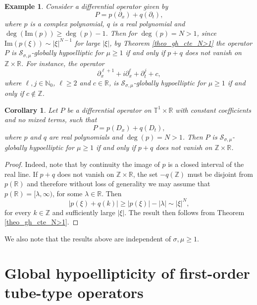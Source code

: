 \documentclass[11pt,reqno]{amsart}
\numberwithin{equation}{section}
\newtheorem{corollary}[theorem]{Corollary}
\newtheorem{example}[theorem]{Example}
\theoremstyle{definition}
\theoremstyle{definition}
\newcommand{\T}{\mathbb{T}}
\newcommand{\R}{\mathbb{R}}
\newcommand{\Z}{\mathbb{Z}}
\newcommand{\N}{\mathbb{N}}
\newcommand{\Imag}{\mathrm{Im}}
\begin{document}
\begin{example}
    Consider a differential operator  given by
    \begin{equation*}
        P=p(\partial_x)+q(\partial_t),
    \end{equation*}
    where $p$ is a complex polynomial, $q$ is a real polynomial and $\deg(\Imag(p))\geq \deg(p)-1$. Then for $\deg(p)=N>1$, since $\Imag(p(\xi))\sim |\xi|^{N-1}$ for large $|\xi|$, by Theorem \ref{theo_gh_cte_N>1} the operator $P$ is $\mathcal{S}_{\sigma,\mu}$-globally hypoelliptic for $\mu\geq 1$ if and only if $p+q$ does not vanish on $\Z\times \R$. For instance, the operator
    \begin{equation*}
\partial_x^{\ell+1}+i\partial_x^{\ell}+\partial_t^j+c,
    \end{equation*}
    where $\ell,j\in\N_0$, $\ell\geq2$ and $c\in\R$, is $\mathcal{S}_{\sigma,\mu}$-globally hypoelliptic for $\mu\geq 1$ if and only if $c\not\in\Z$.
\end{example}

\begin{corollary}
 Let $P$ be a differential operator on $\T^1\times\R$ with constant coefficients and no mixed terms, such that  $$P=p\left(D_x\right)+q\left(D_t\right),$$
   where $p$ and $q$ are real polynomials and $\deg(p)=N>1$. Then $P$ is 
    $\mathcal{S}_{\sigma,\mu}$-globally hypoelliptic for $\mu\geq 1$ if and only if $p+q$ does not vanish on $\Z\times \R$.
\end{corollary}
\begin{proof}
 Indeed, note that by continuity the image of $p$ is a closed interval of the real line. If $p+q$ does not vanish on $\Z\times \R$, the set $-q(\Z)$ must be disjoint from $p(\R)$ and therefore without loss of generality we may assume that $p(\R)=[\lambda,\infty)$, for some $\lambda\in\R$.  Then
 \begin{equation*}
     |p(\xi)+q(k)|\geq |p(\xi)|-|\lambda|\sim |\xi|^N,
 \end{equation*}
 for every $k\in\Z$ and sufficiently large $|\xi|$. The result then follows from Theorem \ref{theo_gh_cte_N>1}.
\end{proof}

We also note that the results above are independent of $\sigma,\mu\geq 1$.



\section{Global hypoellipticity of first-order tube-type operators}\label{sec_gh2}
\end{document}
